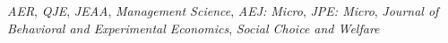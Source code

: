 
\begin{small} \color{black}
\textit{AER}, \textit{QJE}, \textit{JEAA}, \textit{Management Science}, \textit{AEJ: Micro}, \textit{JPE: Micro}, \textit{Journal of Behavioral and Experimental Economics}, \textit{Social Choice and Welfare}
\end{small}







